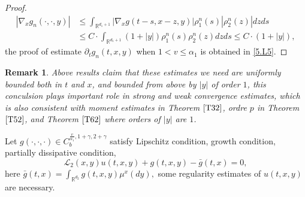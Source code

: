 \documentclass[11pt,reqno]{amsart}
\newtheorem{remark}{\indent Remark}[section]
\numberwithin{equation}{section}
\begin{document}
\begin{proof}
\begin{equation}\label{5.58-32}
\begin{split}
	|\nabla_{x}g_{n}(\cdot,\cdot,y)|&\leq \int_{\mathbb{R}^{ d_{1}+1}}	|\nabla_{x}g(t-s,x-z,y)|\rho_{1}^{n}(s)|\rho_{2}^{n}(z)|dzds\\
	&\leq C\cdot \int_{\mathbb{R}^{ d_{1}+1}}	(1+|y|)\rho_{1}^{n}(s)\rho_{2}^{n}(z)dzds\leq C\cdot (1+|y|),
	\end{split}
\end{equation}
the proof of estimate $\partial_{t}g_{n}(t,x,y)$ when $1<v\leq\alpha_{1}$ is obtained in \eqref{5.L5}.
\end{proof}
\begin{remark}
Above results claim that these estimates we need are uniformly bounded both in $t$ and $x$, and  bounded from above by $|y|$ of order $1$, this conculsion plays important role in strong and weak convergence estimates, which is also consistent with moment estimates in Theorem $\ref{T32}$, ordre $p$ in Theorem $\ref{T52}$, and Theorem $\ref{T62}$ where orders of $|y|$ are $1$.
\end{remark}



\iffalse
Let $g(\cdot,\cdot,\cdot)\in C_{b}^{\frac{v}{\alpha_{1}},1+\gamma, 2+\gamma}$  satisfy Lipschitz condition, growth condition, partially dissipative condition,
\begin{equation}\label{5.1}
	\mathcal{L}_{2}(x,y)u(t,x,y)+g(t,x,y)-\bar{g}(t,x)=0,
\end{equation}
here $ \bar{g}(t,x)=\int_{\mathbb{R}^{d_{2}}}g(t,x,y)\mu^{x}(dy),$ some regularity estimates of $u(t,x,y)$ are necessary.
\end{document}
